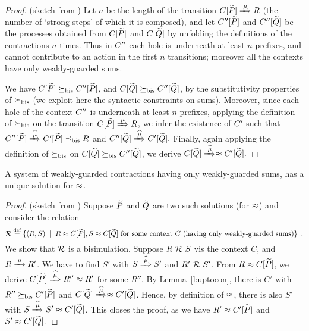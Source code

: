 \begin{proof}{(sketch from \cite{sangiorgi2017equations})}
Let $n$ be the length of the transition $\ct{\til P}\Arr\mu R$  (the
number of `strong steps' of which it is composed), and  
let $C'' [\widetilde P]$ and $C'' [\widetilde Q]$  be the processes obtained
from  $C [\widetilde P]$ and $C [\widetilde Q]$ by unfolding the definitions
of the contractions $n$ times. Thus in $C''$ each hole is
underneath at least $n$ prefixes, and cannot contribute to an action
in the first $n$ transitions; moreover all the contexts have only
weakly-guarded sums.

We have $C [\widetilde P] \mathrel{\succeq_{\rm{bis}}} C'' [\widetilde P]$, and 
$C [\widetilde Q] \mathrel{\succeq_{\rm{bis}}} C'' [\widetilde Q]$, 
 by the substitutivity  properties of $\mathrel{\succeq_{\rm{bis}}}$ (we exploit here
 the syntactic constraints on sums). Moreover,
 since each hole of the  context $C''$ is underneath at least $n$
 prefixes, applying  
the definition
 of $ \mathrel{\succeq_{\rm{bis}}}$ on the transition 
 $\ct{\til P}\Arr{\mu}  R$, we infer the existence
 of $C'$ such that 
$
\ctpp{\til P}\Arcap{\mu} \ctp{\til P} \mexpaBIS R
$
and 
$
\ctpp{\til Q}\Arcap{\mu}  \ctp{\til Q} 
. $
Finally, again applying the definition of $\mathrel{\succeq_{\rm{bis}}}$ on 
$C [\widetilde Q] \mathrel{\succeq_{\rm{bis}}} C'' [\widetilde Q]$, 
we derive 
$
\ct{\til Q}\Arcap{\mu}  \wb \ctp{\til Q} 
.$
\end{proof}

\begin{theorem}
\label{t:contraBisimulationU}
A system of weakly-guarded contractions
having only weakly-guarded sums, has a unique solution for $\approx$.
\end{theorem}

\begin{proof}{(sketch from \cite{sangiorgi2017equations})}
Suppose $\widetilde P$ and $\widetilde Q$ are two such solutions (for $\approx$) and consider
the relation
\begin{equation*}
{\cal R} \stackrel{\mbox{\scriptsize def}}{=} \{ 
(R,S) \; \mid \; R \approx C [\widetilde P], S \approx C [\widetilde Q] \mbox{ for some context
$C$ (having only weakly-guarded sums)} \} \enspace.
\end{equation*}
We show that ${\cal R}$ is a bisimulation. Suppose $R\ {\cal R}\ S$ vis the context
$C$, and $R \arr{\mu} R'$. We have to find $S'$ with $S \Arcap{\mu}
S'$ and $R'\ {\cal R}\ S'$. From $R \approx C[{\widetilde P}]$, we derive $C[{\til P}]
\Arcap{\mu} R'' \wb R'$ for some $R''$. By Lemma~\ref{l:uptocon},
there is $C'$ with $R'' \mathrel{\succeq_{\rm{bis}}} C'[{\widetilde P}]$ and $C[{\til Q}]
\Arcap{\mu} \wb C'[{\til Q}]$. Hence, by definition of $\approx$, there is
also $S'$ with $S \Arcap{\mu} S' \wb C'[{\til Q}]$. This closes the
proof, as we have $R' \approx C'[{\widetilde P}]$ and $S' \approx C'[{\widetilde Q}]$.
\end{proof}

